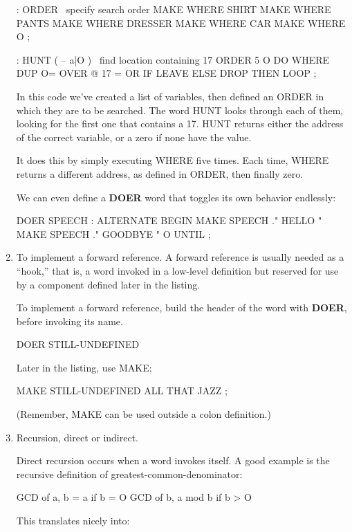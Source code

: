 \begin{enumerate}
\begin{Code}
: ORDER  \  specify search order
   MAKE WHERE  SHIRT   MAKE WHERE  PANTS
   MAKE WHERE  DRESSER   MAKE WHERE CAR
   MAKE WHERE  O ;

: HUNT  ( -- a|O )  \  find location containing 17
   ORDER  5 O DO  WHERE  DUP O=  OVER @  17 =  OR  IF
      LEAVE  ELSE  DROP  THEN  LOOP ;
\end{Code}
In this code we've created a list of variables, then defined an ORDER in
which they are to be searched. The word HUNT looks through each of them,
looking for the first one that contains a 17. HUNT returns either the
address of the correct variable, or a zero if none have the value.

It does this by simply executing WHERE five times. Each time, WHERE
returns a different address, as defined in ORDER, then finally zero.

We can even define a \textbf{DOER} word that toggles its own behavior endlessly:

\begin{Code}
DOER SPEECH
: ALTERNATE
   BEGIN  MAKE SPEECH ." HELLO "
   MAKE SPEECH ." GOODBYE "
   O UNTIL ;
\end{Code}
\item To implement a forward reference. A forward reference is usually needed as
a ``hook,'' that is, a word invoked in a low-level definition but reserved for
use by a component defined later in the listing.

To implement a forward reference, build the header of the word with \textbf{DOER},
before invoking its name.

\begin{Code}
DOER STILL-UNDEFINED
\end{Code}
Later in the listing, use MAKE;

\begin{Code}
MAKE STILL-UNDEFINED  ALL THAT JAZZ ;
\end{Code}
(Remember, MAKE can be used outside a colon definition.)

\item Recursion, direct or indirect.

Direct recursion occurs when a word invokes itself. A good example is the
recursive definition of greatest-common-denominator:

\begin{Code}
GCD of a, b =  a                     if b = O
               GCD of b, a mod b     if b > O
\end{Code}
This translates nicely into:


\end{enumerate}
